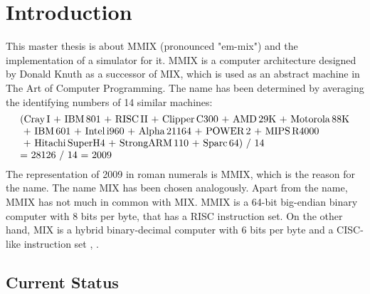 \chapter{Introduction}

This master thesis is about MMIX (pronounced "em-mix") and the implementation of a simulator for it. MMIX is a computer architecture designed by \gls{Donald Knuth} as a successor of MIX, which is used as an abstract machine in \gls{The Art of Computer Programming}. The name has been determined by averaging the identifying numbers of 14 similar machines:
$$\vbox{\halign{#\hfil\cr
	(\text{Cray\,I}~+~\text{IBM\,801}~+~\text{RISC\,II}~+~\text{Clipper\,C300}~+~\text{AMD\,29K}~+~\text{Motorola\,88K}\cr
	~+~\text{IBM\,601}~+~\text{Intel\,i960}~+~\text{Alpha\,21164}~+~\text{POWER\,2}~+~\text{MIPS\,R4000}\cr
	~+~\text{Hitachi\,SuperH4}~+~\text{StrongARM\,110}~+~\text{Sparc\,64}) / 14\cr
	= 28126 / 14 = 2009\cr
}}$$
The representation of 2009 in roman numerals is MMIX, which is the reason for the name. \citep[pg. 2]{taocpf1} The name MIX has been chosen analogously. Apart from the name, MMIX has not much in common with MIX. MMIX is a 64-bit big-endian binary computer with 8 bits per byte, that has a \gls{RISC} instruction set. On the other hand, MIX is a hybrid binary-decimal computer with 6 bits per byte and a \gls{CISC}-like instruction set \citep{gnumdk}, \citep[pg. 124,125]{taocpv1}.

\section{Current Status}

